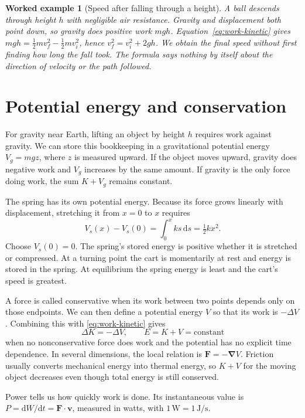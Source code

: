 \documentclass[11pt,oneside]{book}
\newcommand{\dd}{\mathrm{d}}
\newcommand{\vect}[1]{\boldsymbol{#1}}
\newcommand{\grad}{\boldsymbol{\nabla}}
\theoremstyle{reviewstyle}
\newtheorem{example}{Worked example}[chapter]
\begin{document}
\begin{example}[Speed after falling through a height]
A ball descends through height $h$ with negligible air resistance. Gravity and displacement both point down, so gravity does positive work $mgh$. Equation~\eqref{eq:work-kinetic} gives $mgh=\tfrac12m v_f^2-\tfrac12m v_i^2$, hence $v_f^2=v_i^2+2gh$. We obtain the final speed without first finding how long the fall took. The formula says nothing by itself about the direction of velocity or the path followed.
\end{example}

\section{Potential energy and conservation}
For gravity near Earth, lifting an object by height $h$ requires work against gravity. We can store this bookkeeping in a gravitational potential energy $V_g=mgz$, where $z$ is measured upward. If the object moves upward, gravity does negative work and $V_g$ increases by the same amount. If gravity is the only force doing work, the sum $K+V_g$ remains constant.

The spring has its own potential energy. Because its force grows linearly with displacement, stretching it from $x=0$ to $x$ requires
\begin{equation}
V_s(x)-V_s(0)=\int_0^x ks\,\dd s=\tfrac12kx^2.
\end{equation}
Choose $V_s(0)=0$. The spring's stored energy is positive whether it is stretched or compressed. At a turning point the cart is momentarily at rest and energy is stored in the spring. At equilibrium the spring energy is least and the cart's speed is greatest.

A force is called conservative when its work between two points depends only on those endpoints. We can then define a potential energy $V$ so that its work is $-\Delta V$. Combining this with \eqref{eq:work-kinetic} gives
\begin{equation}
\Delta K=-\Delta V,\qquad E=K+V=\text{constant}
\end{equation}
when no nonconservative force does work and the potential has no explicit time dependence. In several dimensions, the local relation is $\vect F=-\grad V$. Friction usually converts mechanical energy into thermal energy, so $K+V$ for the moving object decreases even though total energy is still conserved.

Power tells us how quickly work is done. Its instantaneous value is $P=\dd W/\dd t=\vect F\cdot\vect v$, measured in watts, with $1\,\mathrm W=1\,\mathrm{J/s}$.
\end{document}
